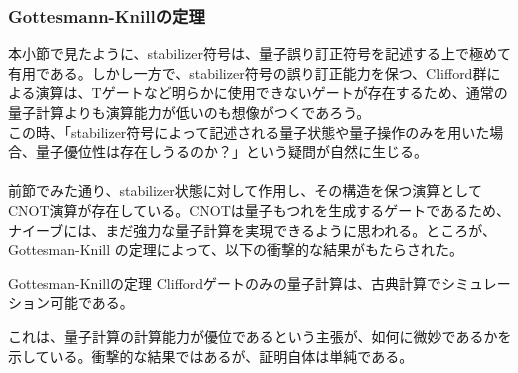 \documentclass[a4paper,10.5pt]{article}
\numberwithin{equation}{section}
\begin{document}
\subsubsection{Gottesmann-Knillの定理}
本小節で見たように、stabilizer符号は、量子誤り訂正符号を記述する上で極めて有用である。しかし一方で、stabilizer符号の誤り訂正能力を保つ、Clifford群による演算は、Tゲートなど明らかに使用できないゲートが存在するため、通常の量子計算よりも演算能力が低いのも想像がつくであろう。\\
この時、「stabilizer符号によって記述される量子状態や量子操作のみを用いた場合、量子優位性は存在しうるのか？」という疑問が自然に生じる。\\
\\
前節でみた通り、stabilizer状態に対して作用し、その構造を保つ演算としてCNOT演算が存在している。CNOTは量子もつれを生成するゲートであるため、ナイーブには、まだ強力な量子計算を実現できるように思われる。ところが、Gottesman-Knill の定理によって、以下の衝撃的な結果がもたらされた。
\begin{theorembox}{Gottesman-Knillの定理}
    Cliffordゲートのみの量子計算は、古典計算でシミュレーション可能である。
\end{theorembox}
これは、量子計算の計算能力が優位であるという主張が、如何に微妙であるかを示している。衝撃的な結果ではあるが、証明自体は単純である。
\end{document}
